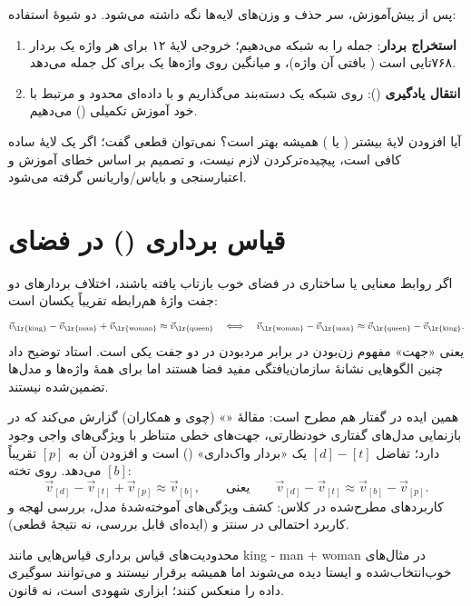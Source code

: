 پس از پیش‌آموزش، سر  حذف و وزن‌های لایه‌ها نگه داشته می‌شود. دو شیوهٔ استفاده:
\begin{enumerate}
  \item \textbf{استخراج بردار}: جمله را به شبکه می‌دهیم؛ خروجی لایهٔ ۱۲ برای هر واژه یک بردار ۷۶۸‌تایی است ( بافتی آن واژه)، و میانگین روی واژه‌ها یک  برای کل جمله می‌دهد.
  \item \textbf{انتقال یادگیری} (): روی شبکه یک دسته‌بند می‌گذاریم و با داده‌ای محدود و مرتبط با  خود آموزش تکمیلی () می‌دهیم.
\end{enumerate}

\begin{exambox}{آیا افزودن لایهٔ بیشتر ( یا ) همیشه بهتر است؟}
نمی‌توان قطعی گفت؛ اگر یک لایهٔ ساده کافی است، پیچیده‌ترکردن لازم نیست، و تصمیم بر اساس خطای آموزش و اعتبارسنجی و بایاس/واریانس گرفته می‌شود.
\end{exambox}

\section{قیاس برداری () در فضای }

اگر روابط معنایی یا ساختاری در فضای  خوب بازتاب یافته باشند، اختلاف بردارهای دو جفت واژهٔ هم‌رابطه تقریباً یکسان است:
\[
\vec{v}_{\text{\lr{king}}}-\vec{v}_{\text{\lr{man}}}+\vec{v}_{\text{\lr{woman}}}\approx\vec{v}_{\text{\lr{queen}}}
\quad\Longleftrightarrow\quad
\vec{v}_{\text{\lr{woman}}}-\vec{v}_{\text{\lr{man}}}\approx\vec{v}_{\text{\lr{queen}}}-\vec{v}_{\text{\lr{king}}} .
\]
یعنی «جهت» مفهوم زن‌بودن در برابر مرد‌بودن در دو جفت یکی است. استاد توضیح داد چنین الگوهایی نشانهٔ سازمان‌یافتگی مفید فضا هستند اما برای همهٔ واژه‌ها و مدل‌ها تضمین‌شده نیستند.

همین ایده در گفتار هم مطرح است: مقالهٔ «» (چوی و همکاران) گزارش می‌کند که در بازنمایی مدل‌های گفتاری خودنظارتی، جهت‌های خطی متناظر با ویژگی‌های واجی وجود دارد؛ تفاضل $[d]-[t]$ یک «بردار واک‌داری» () است و افزودن آن به $[p]$ تقریباً $[b]$ می‌دهد. روی تخته:
\[
\vec{v}_{[d]}-\vec{v}_{[t]}+\vec{v}_{[p]}\approx\vec{v}_{[b]},\qquad\text{یعنی}\qquad \vec{v}_{[d]}-\vec{v}_{[t]}\approx\vec{v}_{[b]}-\vec{v}_{[p]}.
\]
کاربردهای مطرح‌شده در کلاس: کشف ویژگی‌های آموخته‌شدهٔ مدل، بررسی لهجه و کاربرد احتمالی در سنتز و  (ایده‌ای قابل بررسی، نه نتیجهٔ قطعی).

\begin{correctionbox}{محدودیت‌های قیاس برداری}
قیاس‌هایی مانند king - man + woman در مثال‌های خوب‌انتخاب‌شده و  ایستا دیده می‌شوند اما همیشه برقرار نیستند و می‌توانند سوگیری داده را منعکس کنند؛ ابزاری شهودی است، نه قانون.
\end{correctionbox}

